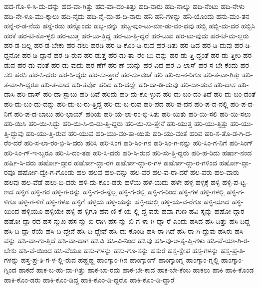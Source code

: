 {ಹದ-ಗೊ-ಳಿ-ಸಿ-ದು-ದನ್ನು
ಹದ-ವಾ-ಗಿತ್ತು
ಹದ-ವಾ-ದಂ-ತಿತ್ತು
ಹದಿ-ನಾರು
ಹದಿ-ನಾಲ್ಕು
ಹದಿ-ನೆಂಟು
ಹದಿ-ನೇಳು
ಹದಿ-ನೇ-ಳೂ-ಮು-ಕ್ಕಾಲು
ಹದಿ-ನೈದು
ಹದಿ-ನೈ-ದು-ಹ-ದಿ-ನಾರು
ಹನಿ
ಹನಿ-ಗಳನ್ನು
ಹನಿ-ಯೊಂದು
ಹನು-ಮಂ-ತನ
ಹನ್ನೆ-ರ-ಡ-ನೆಯ
ಹನ್ನೆ-ರಡು
ಹನ್ನೊಂದು
ಹಬ್ಬ-ವನ್ನು
ಹಬ್ಬ-ವುಂ-ಟು-ಮಾ-ಡು-ವಂ-ಥವು
ಹಬ್ಬಿ
ಹಬ್ಬಿ-ದು-ದರ
ಹಬ್ಬಿಸಿ
ಹರಕೆ
ಹರ-ಟಿ-ಕೊ-ಳ್ಳಲಿ
ಹರ-ಟುತ್ತ
ಹರ-ಟು-ತ್ತಿದ್ದ
ಹರ-ಟು-ತ್ತಿ-ದ್ದರೆ
ಹರ-ಟುವ
ಹರ-ಟು-ವುದು
ಹರ-ಟೆ-ಮ-ಲ್ಲರು
ಹರ-ಡ-ಬಲ್ಲ
ಹರ-ಡ-ಬೇಕು
ಹರ-ಡಲು
ಹರಡಿ
ಹರ-ಡಿ-ಕೊಂ-ಡಿ-ರುವ
ಹರ-ಡಿತು
ಹರ-ಡಿದ
ಹರ-ಡಿ-ದುವು
ಹರ-ಡಿ-ದ್ದನೋ
ಹರ-ಡಿ-ದ್ದಾನೆ
ಹರ-ಡಿ-ರುವ
ಹರ-ಡುತ್ತ
ಹರ-ಡು-ತ್ತಾ-ರೆಂ-ಬು-ದನ್ನು
ಹರ-ಡು-ತ್ತಿ-ದ್ದಂತೆ
ಹರ-ಡು-ತ್ತೀರಿ
ಹರ-ಡುವ
ಹರ-ಡು-ವಂತೆ
ಹರ-ಡು-ವುದು
ಹರ-ಣೆಗೆ
ಹರ-ಣೆ-ಯನ್ನು
ಹರ-ವಿದ
ಹರ-ವಿ-ಲಾಸ್
ಹರ-ಸ-ಬೇ-ಕೆಂದು
ಹರ-ಸಲಿ
ಹರಸಿ
ಹರ-ಸಿ-ದರು
ಹರ-ಸಿ-ದ್ದರು
ಹರ-ಸು-ತ್ತಾರೆ
ಹರ-ಸು-ವಂತೆ
ಹರಿ
ಹರಿ-ಜ-ನ-ರಿಗೂ
ಹರಿ-ತ-ವಾ-ಗಿತ್ತು
ಹರಿ-ತ-ವಾ-ಗಿ-ದ್ದರೂ
ಹರಿ-ತ-ವಾದ
ಹರಿ-ತವೋ
ಹರಿದ
ಹರಿ-ದದ್ದೇ
ಹರಿ-ದಾ-ಡಿ-ದುವು
ಹರಿ-ದಾ-ಡುವ
ಹರಿ-ದಾಸ
ಹರಿ-ದಾಸಿ
ಹರಿ-ದಾಸ್
ಹರಿ-ದಾ-ಸ್ಬಾಬು
ಹರಿ-ದಿವೆ
ಹರಿದು
ಹರಿ-ದು-ಕೊ-ಳ್ಳುವ
ಹರಿ-ದು-ಬಂ-ದಂ-ತಿದೆ
ಹರಿ-ದು-ಬಂ-ದಂತೆ
ಹರಿ-ದು-ಬಂ-ದು-ದನ್ನು
ಹರಿ-ದು-ಬ-ರು-ತ್ತಿದ್ದ
ಹರಿ-ದು-ಬ-ರುವ
ಹರಿ-ಪದ
ಹರಿ-ಪ-ದನ
ಹರಿ-ಪ-ದ-ನಲ್ಲಿ
ಹರಿ-ಪ-ದ-ನಿಗೆ
ಹರಿ-ಪ-ದ-ಬಾಬು
ಹರಿ-ಭಾಯ್
ಹರಿಯ
ಹರಿ-ಯ-ಲಾ-ರಂ-ಭಿ-ಸಿತು
ಹರಿ-ಯಿತು
ಹರಿ-ಯಿ-ಸಲಿ
ಹರಿ-ಯಿ-ಸಲು
ಹರಿ-ಯಿಸಿ
ಹರಿ-ಯಿ-ಸಿದ್ದು
ಹರಿ-ಯಿ-ಸಿ-ಬಿ-ಡು-ತ್ತಿ-ದ್ದರು
ಹರಿ-ಯಿ-ಸು-ತ್ತೇನೆ
ಹರಿ-ಯುತ್ತ
ಹರಿ-ಯು-ತ್ತಿತ್ತು
ಹರಿ-ಯು-ತ್ತಿ-ದ್ದುವು
ಹರಿ-ಯು-ತ್ತಿ-ರುವ
ಹರಿ-ಯುವ
ಹರಿ-ಯು-ವಂ-ತಾ-ಯಿತು
ಹರಿ-ಯು-ವಂತೆ
ಹರಿವ
ಹರಿ-ಸ-ತೊ-ಡ-ಗಿ-ದ-ರೆಂ-ದರೆ
ಹರಿ-ಸ-ಲಾ-ರಂ-ಭಿ-ಸಿ-ದರು
ಹರಿಸಿ
ಹರಿ-ಸಿಂಗ
ಹರಿ-ಸಿಂ-ಗನ
ಹರಿ-ಸಿಂ-ಗ-ನನ್ನು
ಹರಿ-ಸಿಂ-ಗ-ನಿಗೆ
ಹರಿ-ಸಿಂಗ್
ಹರಿ-ಸಿಂ-ಗ್-ಇ-ಬ್ಬರೂ
ಹರಿ-ಸಿ-ದಂ-ತಹ
ಹರಿ-ಸಿ-ದರು
ಹರಿ-ಸಿ-ರುವ
ಹರಿ-ಸು-ತ್ತಿ-ದ್ದರು
ಹರಿ-ಹ-ರಿದು
ಹರ್ಷಾ-ನಂದ
ಹರ್ಷಿ-ಸಿ-ದರು
ಹರ್ಷೋ-ದ್ಗಾರ
ಹರ್ಷೋ-ದ್ಗಾ-ರಗ
ಹರ್ಷೋ-ದ್ಗಾ-ರ-ಗಳ
ಹರ್ಷೋ-ದ್ಗಾ-ರ-ಗಳಿಂದ
ಹರ್ಷೋ-ದ್ಗಾ-ರವೂ
ಹರ್ಷೋ-ದ್ವೇ-ಗ-ಗೊಂಡು
ಹಲ
ಹಲವ
ಹಲ-ವನ್ನು
ಹಲ-ವರ
ಹಲ-ವ-ರಾ-ದರೆ
ಹಲ-ವರು
ಹಲ-ವಾರು
ಹಲವು
ಹಲ-ವೆಡೆ
ಹಲು-ಬಿ-ದರು
ಹಳಿ-ದು-ಕೊಂ-ಡರು
ಹಳೆಯ
ಹಳೆ-ಯದು
ಹಳೇ
ಹಳ್ಳ
ಹಳ್ಳಕ್ಕೆ
ಹಳ್ಳಿ
ಹಳ್ಳಿ-ಪ-ಟ್ಟ-ಣದ
ಹಳ್ಳಿಗ
ಹಳ್ಳಿ-ಗರ
ಹಳ್ಳಿ-ಗ-ರನ್ನು
ಹಳ್ಳಿ-ಗ-ರ-ನ್ನೆಲ್ಲ
ಹಳ್ಳಿ-ಗ-ರಲ್ಲಿ
ಹಳ್ಳಿ-ಗ-ರಿಂದ
ಹಳ್ಳಿ-ಗಳ
ಹಳ್ಳಿ-ಗಳಲ್ಲಿ
ಹಳ್ಳಿ-ಗ-ಳಿಗೂ
ಹಳ್ಳಿ-ಗ-ಳಿಗೆ
ಹಳ್ಳಿ-ಗಳೂ
ಹಳ್ಳಿಗೆ
ಹಳ್ಳಿಯ
ಹಳ್ಳಿ-ಯನ್ನು
ಹಳ್ಳಿ-ಯಲ್ಲಿ
ಹಳ್ಳಿ-ಯ-ವ-ರೆಗೂ
ಹಳ್ಳಿ-ಯಾದ
ಹಳ್ಳಿ-ಯಿಂದ
ಹಳ್ಳಿಯೂ
ಹಳ್ಳಿಯೇ
ಹಳ್ಳಿ-ಹ-ಳ್ಳಿಗೂ
ಹವ-ಣಿ-ಕೆ-ಯ-ಲ್ಲಿ-ದ್ದ-ವರು
ಹವಾ-ಗುಣ
ಹವಿ-ಸ್ಸನ್ನು
ಹಷೋ-ದ್ಗಾರ
ಹಷೋ-ದ್ಗಾ-ರದ
ಹಸ-ನ್ಮುಖ
ಹಸ-ನ್ಮು-ಖ-ರಾಗಿ
ಹಸ-ನ್ಮು-ಖಿ-ಗ-ಳಾ-ಗಿ-ದ್ದಾ-ರೆ-ಎಂದು
ಹಸಿದ
ಹಸಿ-ದಿತ್ತು
ಹಸಿ-ದಿದ್ದ
ಹಸಿ-ದಿ-ದ್ದಾ-ರೆಯೆ
ಹಸಿ-ದಿ-ದ್ದೇನೆ
ಹಸಿ-ದಿ-ದ್ದೇವೆ
ಹಸಿ-ದು-ಕೊಂಡಿ
ಹಸಿ-ರಾ-ಗಿದೆ
ಹಸಿ-ರಾ-ಗಿ-ದ್ದುವು
ಹಸಿರು
ಹಸಿ-ವನ್ನು
ಹಸಿ-ವಾ-ಗು-ತ್ತಿದೆ
ಹಸಿ-ವಾ-ದಾಗ
ಹಸಿವಿ
ಹಸಿ-ವಿ-ನಿಂದ
ಹಸಿವು
ಹಸಿ-ವು-ಅ-ತೃ-ಪ್ತಿ-ಗಳು
ಹಸಿ-ವೆ-ಯಾ-ಗಿ-ರ-ಬೇಕು
ಹಸಿ-ವೆ-ಯಿಂದ
ಹಸಿ-ವೆಯೂ
ಹಸು-ಗಳನ್ನು
ಹಸು-ಗೂ-ಸನ್ನು
ಹಸುರೆ
ಹಸ್ತ-ಕ್ಷೇಪ
ಹಸ್ತ-ಗಳನ್ನು
ಹಸ್ತ-ಪ್ರ-ತಿ-ಗಳನ್ನು
ಹಸ್ತ-ಪ್ರ-ತಿ-ಗ-ಳ-ಲ್ಲಿ-ರುವ
ಹಹ್ಹಹ್ಹ
ಹಾಂಗ್ಕಾಂ-ಗಿನ
ಹಾಂಗ್ಕಾಂಗ್
ಹಾಂಗ್ಕಾಂಗ್ನ
ಹಾಂಗ್ಕಾಂ-ಗ್ನಲ್ಲಿ
ಹಾಂಗ್ಕಾಂ-ಗ್ನಿಂದ
ಹಾಕದೆ
ಹಾಕ-ಬ-ಹು-ದಾ-ಗಿತ್ತು
ಹಾಕ-ಬಾ-ರದು
ಹಾಕ-ಬೇ-ಕಾದ
ಹಾಕ-ಬೇ-ಕೆಂಬ
ಹಾಕಲು
ಹಾಕಿ
ಹಾಕಿ-ಕೊಂಡ
ಹಾಕಿ-ಕೊಂ-ಡರು
ಹಾಕಿ-ಕೊಂ-ಡಿದ್ದ
ಹಾಕಿ-ಕೊಂ-ಡಿ-ದ್ದರೊ
ಹಾಕಿ-ಕೊಂ-ಡಿ-ದ್ದಾರೆ
}
